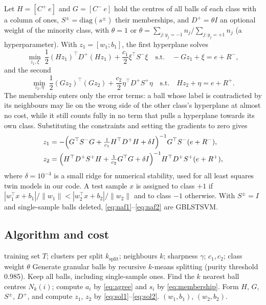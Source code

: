 \documentclass[preprint,12pt]{elsarticle}
\newcommand{\NAF}{NAF-GBLSTSVM}
\begin{document}
Let $H=[C^{+}\ e]$ and $G=[C^{-}\ e]$ hold the centres of all balls of each class with a column of ones, $S^{\pm}=\mathrm{diag}(s^{\pm})$ their memberships, and $D^{+}=\theta I$ an optional weight of the minority class, with $\theta=1$ or $\theta=\sum_{j:y_j=-1}n_j/\sum_{j:y_j=+1}n_j$ (a hyperparameter). With $z_1=[w_1;b_1]$, the first hyperplane solves
\begin{equation}
\min_{z_1,\xi}\ \frac{1}{2}(Hz_1)^{\top}D^{+}(Hz_1)+\frac{c_1}{2}\xi^{\top}S^{-}\xi
\quad\text{s.t.}\quad -Gz_1+\xi=e+R^{-},
\label{eq:naf1}
\end{equation}
and the second
\begin{equation}
\min_{z_2,\eta}\ \frac{1}{2}(Gz_2)^{\top}(Gz_2)+\frac{c_2}{2}\eta^{\top}D^{+}S^{+}\eta
\quad\text{s.t.}\quad Hz_2+\eta=e+R^{+}.
\label{eq:naf2}
\end{equation}
The membership enters only the error terms: a ball whose label is contradicted by its neighbours may lie on the wrong side of the other class's hyperplane at almost no cost, while it still counts fully in no term that pulls a hyperplane towards its own class. Substituting the constraints and setting the gradients to zero gives
\begin{align}
z_1&=-\Bigl(G^{\top}S^{-}G+\tfrac{1}{c_1}H^{\top}D^{+}H+\delta I\Bigr)^{-1}G^{\top}S^{-}(e+R^{-}),\label{eq:sol1}\\
z_2&=\Bigl(H^{\top}D^{+}S^{+}H+\tfrac{1}{c_2}G^{\top}G+\delta I\Bigr)^{-1}H^{\top}D^{+}S^{+}(e+R^{+}),\label{eq:sol2}
\end{align}
where $\delta=10^{-4}$ is a small ridge for numerical stability, used for all least squares twin models in our code. A test sample $x$ is assigned to class $+1$ if $|w_1^{\top}x+b_1|/\lVert w_1\rVert<|w_2^{\top}x+b_2|/\lVert w_2\rVert$ and to class $-1$ otherwise. With $S^{\pm}=I$ and single-sample balls deleted, \eqref{eq:naf1}--\eqref{eq:naf2} are GBLSTSVM.

\subsection{Algorithm and cost}

\begin{algorithm}[t]
\caption{Training of \NAF{}}
\label{alg:naf}
\begin{algorithmic}[1]
\Require training set $T$; clusters per split $k_{\text{split}}$; neighbours $k$; sharpness $\gamma$; $c_1,c_2$; class weight $\theta$
\State Generate granular balls by recursive $k$-means splitting (purity threshold 0.985). Keep all balls, including single-sample ones.
\State Find the $k$ nearest ball centres $N_k(i)$; compute $a_i$ by \eqref{eq:agree} and $s_i$ by \eqref{eq:membership}.
\EndFor
\State Form $H$, $G$, $S^{\pm}$, $D^{+}$, and compute $z_1$, $z_2$ by \eqref{eq:sol1}--\eqref{eq:sol2}.
\Ensure $(w_1,b_1)$, $(w_2,b_2)$.
\end{algorithmic}
\end{algorithm}
\end{document}
